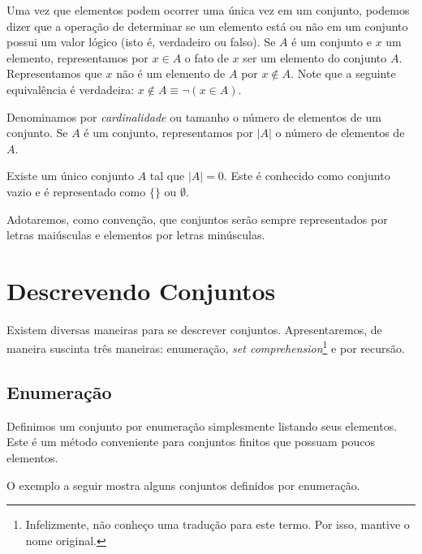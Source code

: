 Uma vez que elementos podem ocorrer uma única vez em um conjunto,
podemos dizer que a operação de determinar se um elemento está ou não
em um conjunto possui um valor lógico (isto é, verdadeiro ou
falso). Se $A$ é um conjunto e $x$ um elemento, representamos por $x
\in A$ o fato de $x$ ser um elemento do conjunto $A$. Representamos que $x$ não
é um elemento de $A$ por $x \not\in A$. Note que a seguinte
equivalência é verdadeira: $x\not\in A \equiv \neg (x \in A)$.

Denominamos por \emph{cardinalidade} ou tamanho o número de elementos
de um conjunto. Se $A$ é um conjunto, representamos por $|A|$ o número
de elementos de $A$.

Existe um único conjunto $A$ tal que $|A| = 0$. Este é conhecido como
conjunto vazio e é representado como $\{\}$ ou $\emptyset$.

Adotaremos, como convenção, que conjuntos
serão sempre representados por letras maiúsculas e elementos por
letras minúsculas.


\section{Descrevendo Conjuntos}

Existem diversas maneiras para se descrever conjuntos. Apresentaremos,
de maneira suscinta três maneiras: enumeração, \emph{set
  comprehension}\footnote{Infelizmente, não conheço uma tradução para
  este termo. Por isso, mantive o nome original.} e por recursão.

\subsection{Enumeração}

Definimos um conjunto por enumeração simplesmente listando seus
elementos. Este é um método conveniente para conjuntos finitos que
possuam poucos elementos.

O exemplo a seguir mostra alguns conjuntos
definidos por enumeração.

